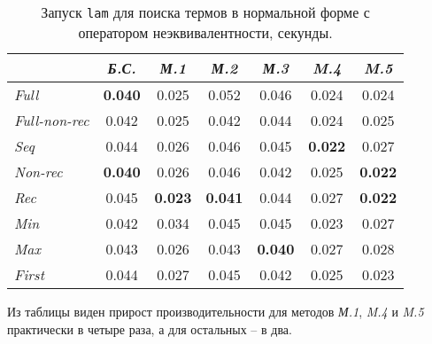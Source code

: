 \begin{table}[h!]
\center
\begin{tabular}{|l|c|c|c|c|c|c|}
\hline
   &{\it Б.С.}&{\it М.1}&{\it М.2}&{\it М.3}&{\it M.4}&{\it M.5} \\ \hline

{\it Full        } & {\bf 0.040} &  0.025    & 0.052     &0.046      & 0.024     & 0.024 \\ \hline
{\it Full-non-rec} & 0.042       &  0.025    & 0.042     &0.044      & 0.024     & 0.025 \\ \hline
{\it Seq         } & 0.044       &  0.026    & 0.046     &0.045      &{\bf 0.022}& 0.027 \\ \hline
{\it Non-rec     } & {\bf 0.040} &  0.026    & 0.046     &0.042      & 0.025     &{\bf 0.022} \\ \hline
{\it Rec         } & 0.045       &{\bf 0.023}&{\bf 0.041}&0.044      & 0.027     &{\bf 0.022} \\ \hline
{\it Min         } & 0.042       &  0.034    & 0.045     &0.045      & 0.023     & 0.027 \\ \hline
{\it Max         } & 0.043       &  0.026    & 0.043     &{\bf 0.040}& 0.027     & 0.028 \\ \hline
{\it First       } & 0.044       &  0.027    & 0.045     &0.042      & 0.025     & 0.023 \\ \hline
\end{tabular}
\caption{Запуск \lstinline{lam} для поиска термов в нормальной форме с оператором неэквивалентности, секунды.}
\label{fig:lamTestDiseqSimple}
\end{table}

Из таблицы виден прирост производительности для методов {\it М.1}, {\it M.4} и
{\it M.5} практически в четыре раза, а для остальных -- в два. \\

